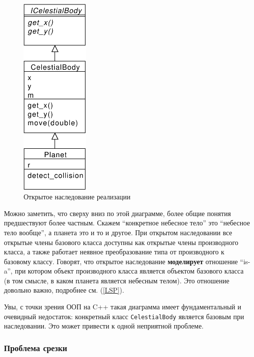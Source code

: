 \documentclass[a4paper,12pt,oneside]{article}
\begin{document}
\begin{figure}[h!]
\centering
\includegraphics[width=0.3\textwidth]{illustrations/impl-inheritance-crop.pdf}
\caption{Открытое наследование реализации}
\label{fig:inheritance-implementation}
\end{figure}

Можно заметить, что сверху вниз по этой диаграмме, более общие понятия предшествуют более частным. Скажем ``конкретное небесное тело'' это ``небесное тело вообще'', а планета это и то и другое. При открытом наследовании все открытые члены базового класса доступны как открытые члены производного класса, а также работает неявное преобразование типа от производного к базовому классу. Говорят, что открытое наследование \textbf{моделирует} отношение ``is-a'', при котором объект производного класса является объектом базового класса (в том смысле, в каком планета является небесным телом). Это отношение довольно важно, подробнее см. (\ref{LSP}).

Увы, с точки зрения ООП на C++ такая диаграмма имеет фундаментальный и очевидный недостаток: конкретный класс \lstinline!CelestialBody! является базовым при наследовании. Это может привести к одной неприятной проблеме.

\subsubsection{Проблема срезки}\label{Cutting}
\end{document}
